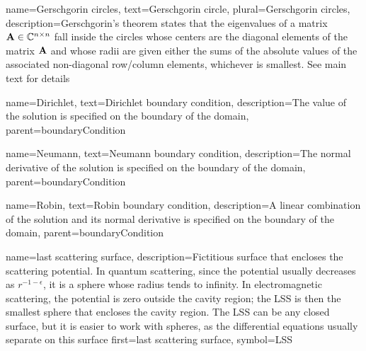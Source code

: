 %
{%
  name={Gerschgorin circles},
  text={Gerschgorin circle},
  plural={Gerschgorin circles},
  description={Gerschgorin's theorem states that the eigenvalues of a matrix $\mathbf{A}\in\mathbb{C}^{n\times n}$ %
		fall inside the circles whose centers are the diagonal elements of the matrix $\mathbf{A}$ and whose
		radii are given either the sums of the absolute values of the associated non-diagonal row/column elements,
		whichever is smallest. See main text for details}
}


%
{%
	name={Dirichlet},
	text={Dirichlet boundary condition},
	description={The value of the solution is specified on the boundary of the domain},
	parent={boundaryCondition}
}

%
{%
	name={Neumann},
	text={Neumann boundary condition},
	description={The normal derivative of the solution is specified on the boundary of the domain},
	parent={boundaryCondition}
}

%
{%
	name={Robin}, 
	text={Robin boundary condition},
	description={A linear combination of the solution and its normal derivative is specified on the boundary of the domain},
	parent={boundaryCondition}
}

{
	name={last scattering surface},
	description={Fictitious surface that encloses the scattering potential. In quantum scattering,
					since the potential usually decreases as $r^{-1-\epsilon}$, it is a
					sphere whose radius tends to infinity. In electromagnetic scattering, 
					the potential is zero outside the cavity region; the LSS is then 
					the smallest sphere that encloses the cavity region. The LSS can be 
					any closed surface, but it is easier to work with spheres, as the differential
					equations usually separate on this surface}
	first={last scattering surface},
	symbol={LSS} 
}
  